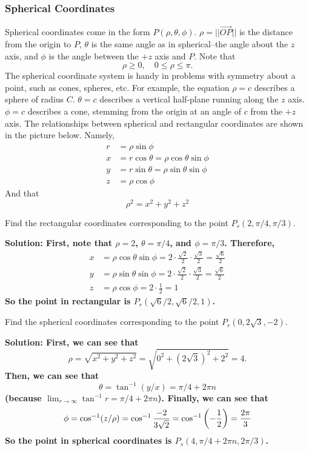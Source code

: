 \subsubsection{Spherical Coordinates}
Spherical coordinates come in the form \(P(\rho, \theta, \phi)\). \(\rho=||\overrightarrow{OP}||\) is the distance from the origin to \(P\), \(\theta\) is the same angle as in spherical--the angle about the \(z\) axis, and \(\phi\) is the angle between the \(+z\) axis and \(P\). Note that \[\rho \geq 0, \quad 0\leq \rho\leq\pi.\]
The spherical coordinate system is handy in problems with symmetry about a point, such as cones, spheres, etc. For example, the equation \(\rho = c\) describes a sphere of radius \(C\). \(\theta=c\) describes a vertical half-plane running along the \(z\) axis. \(\phi=c\) describes a cone, stemming from the origin at an angle of \(c\) from the \(+z\) axis. 
The relationships between spherical and rectangular coordinates are shown in the picture below.
Namely, \begin{align*}
    r &= \rho\sin\phi \\
    x &= r\cos\theta = \rho\cos\theta\sin\phi\\
    y &= r\sin\theta = \rho \sin\theta\sin\phi\\
    z &= \rho\cos\phi
\end{align*}
And that
\[\rho^2 = x^2+y^2+z^2\]
\begin{example}
    Find the rectangular coordinates corresponding to the point \(P_s(2, \pi/4, \pi/3)\).\par\bf{Solution: }First, note that \(\rho=2\), \(\theta = \pi/4\), and \(\phi = \pi/3\). Therefore,
    \begin{align*}
        x &= \rho\cos\theta\sin\phi = 2\cdot \frac{\sqrt{2}}{2}\cdot\frac{\sqrt{3}}{2} = \frac{\sqrt 6}{2} \\
        y &= \rho\sin\theta\sin\phi = 2\cdot \frac{\sqrt 2}2\cdot \frac{\sqrt 3}2 = \frac{\sqrt 6}2 \\
        z &= \rho\cos\phi = 2\cdot \frac{1}{2} = 1
    \end{align*}
    So the point in rectangular is \(P_r(\sqrt{6}/2, \sqrt{6}/2, 1)\).
\end{example}
\begin{example}
    Find the spherical coordinates corresponding to the point \(P_r(0, 2\sqrt 3, -2)\).\par\bf{Solution: }First, we can see that \[\rho = \sqrt{x^2+y^2+z^2} = \sqrt{0^2+(2\sqrt3)^2+2^2} = 4.\]Then, we can see that \[\theta = \tan^{-1}(y/x) = \pi/4+2\pi n\](because \(\lim_{r\to\infty}\tan^{-1}r=\pi/4+2\pi n\)). Finally, we can see that \[\phi = \cos^{-1}(z/\rho)=\cos^{-1}\frac{-2}{3\sqrt 2} = \cos^{-1}\pqty{-\frac{1}{2}}=\frac{2\pi}{3}\]
    So the point in spherical coordinates is \(P_s(4, \pi/4+2\pi n, 2\pi/3)\).
\end{example}

